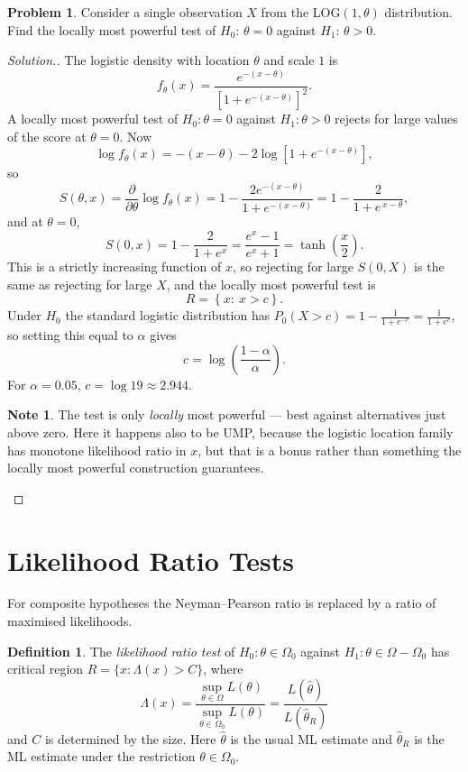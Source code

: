 \documentclass[12pt,a4paper]{report}
\theoremstyle{definition}
\newtheorem{defn}[thm]{Definition}
\newtheorem*{note}{Note}
\newtheorem{problemx}{Problem}[section]
\newenvironment{problem}{\begin{problemx}}{\end{problemx}}
\newenvironment{solution}
  {\renewcommand{\qedsymbol}{}\begin{proof}[\textit{Solution}.]}
  {\end{proof}}
\begin{document}
\begin{problem}
Consider a single observation $X$ from the LOG$(1,\theta)$ distribution. Find the locally most powerful test of $H_0:\, \theta = 0$ against $H_1:\, \theta > 0$.
\end{problem}

\begin{solution}
The logistic density with location $\theta$ and scale $1$ is
\[f_{\theta}(x) = \frac{e^{-(x-\theta)}}{\left[1+e^{-(x-\theta)}\right]^{2}} .\]
A locally most powerful test of $H_0:\theta=0$ against $H_1:\theta>0$ rejects
for large values of the score at $\theta=0$. Now
\[\log f_{\theta}(x) = -(x-\theta) - 2\log\left[1+e^{-(x-\theta)}\right],\]
so
\[S(\theta,x) = \frac{\partial}{\partial\theta}\log f_{\theta}(x)
= 1 - \frac{2e^{-(x-\theta)}}{1+e^{-(x-\theta)}}
= 1 - \frac{2}{1+e^{\,x-\theta}} ,\]
and at $\theta=0$,
\[S(0,x) = 1 - \frac{2}{1+e^{x}} = \frac{e^{x}-1}{e^{x}+1} = \tanh\!\left(\frac{x}{2}\right).\]
This is a strictly increasing function of $x$, so rejecting for large $S(0,X)$
is the same as rejecting for large $X$, and the locally most powerful test is
\[R = \left\{x:\ x > c\right\}.\]
Under $H_0$ the standard logistic distribution has
$P_0(X>c) = 1-\frac{1}{1+e^{-c}} = \frac{1}{1+e^{c}}$, so setting this equal to
$\alpha$ gives
\[c = \log\left(\frac{1-\alpha}{\alpha}\right).\]
For $\alpha=0.05$, $c=\log 19 \approx 2.944$.

\begin{note}
The test is only \emph{locally} most powerful --- best against alternatives just
above zero. Here it happens also to be UMP, because the logistic location family
has monotone likelihood ratio in $x$, but that is a bonus rather than something
the locally most powerful construction guarantees.
\end{note}
\end{solution}

\section{Likelihood Ratio Tests}

For composite hypotheses the Neyman--Pearson ratio is replaced by a ratio of maximised
likelihoods.

\begin{defn}
\label{def:lrt}
The \emph{likelihood ratio test} of $H_0\colon\theta\in\Omega_0$ against
$H_1\colon\theta\in\Omega - \Omega_0$ has critical region $R = \{x : \Lambda(x)>C\}$, where
\[\Lambda(x) = \frac{\sup_{\theta\in\Omega}L(\theta)}{\sup_{\theta\in\Omega_0}L(\theta)} = \frac{L(\hat\theta)}{L(\hat\theta_R)}\]
and $C$ is determined by the size. Here $\hat\theta$ is the usual ML estimate and
$\hat\theta_R$ is the ML estimate under the restriction $\theta\in\Omega_0$.
\end{defn}
\end{document}
